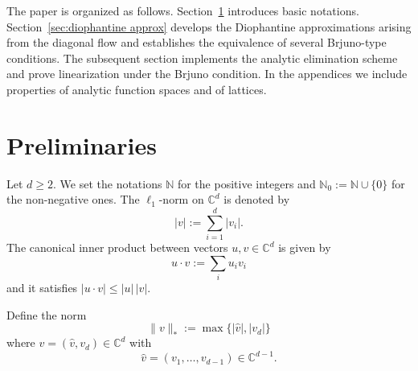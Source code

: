 \documentclass[12pt,reqno,a4paper]{amsart}%
\numberwithin{equation}{section}
\newtheorem{theorem}{Theorem}[section]
\newcommand{\Cc}{{\mathbb{C}}}
\newcommand{\Nn}{{\mathbb{N}}}
\newcommand{\Rr}{{\mathbb{R}}}
\newcommand{\Tt}{{\mathbb{T}}}
\newcommand{\id}  {\operatorname{id}}
\newcommand{\rot}{\operatorname{rot}}
\newcommand{\te}[1]{\quad\text{#1}\quad}
\newcommand{\tcb}{\textcolor{blue}}
\begin{document}
\medskip

The paper is organized as follows. 
Section~\ref{section:Preliminaries} introduces basic notations. 
Section~\ref{sec:diophantine approx} develops the Diophantine approximations arising from the diagonal flow and establishes the equivalence of several Brjuno-type conditions. 
The subsequent section implements the analytic elimination scheme and prove linearization under the Brjuno condition.
In the appendices we include properties of analytic function spaces and of lattices.

%
%
%




\section{Preliminaries}\label{section:Preliminaries}

Let $d\geq2$. We set the notations $\Nn$ for the positive integers and $\Nn_0:=\Nn\cup\{0\}$ for the non-negative ones. 
The $\ell_1$-norm on $\Cc^d$ is denoted by
$$
|v|:=\sum_{i=1}^d|v_i|.
$$ 
The canonical inner product between vectors $u,v\in\Cc^d$ is given by 
$$
u\cdot v:=\sum_iu_iv_i
$$ 
and it satisfies
$
|u\cdot v| \leq |u|\,|v|.
$

Define the norm
$$
\|v\|_*:=\max\{ |\hat v|,|v_d|\}
$$
where  $v=(\hat v,v_d)\in\Cc^d$ with 
$$
\hat v=(v_1,\dots,v_{d-1})\in\Cc^{d-1}.
$$
\end{document}
